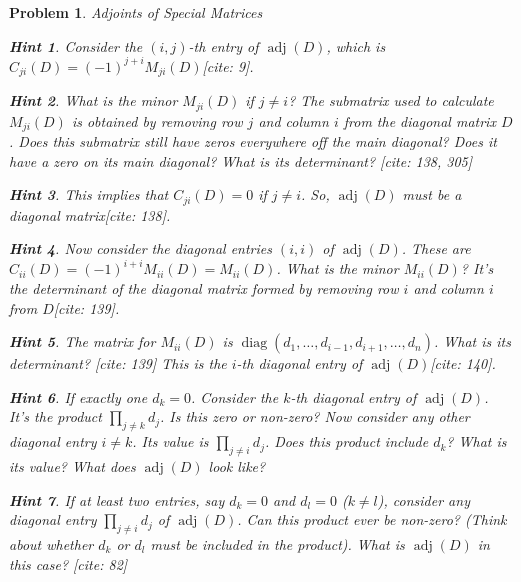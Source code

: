 \documentclass[12pt]{article}
\newtheorem{problem}{Problem}[section]
\theoremstyle{definition}
\newtheorem{hint}{Hint}[question]
\newcommand{\adj}{\operatorname{adj}}
\begin{document}
\begin{problem}{Adjoints of Special Matrices}
        \begin{hint}
            Consider the $(i, j)$-th entry of $\adj(D)$, which is $C_{ji}(D) = (-1)^{j+i} M_{ji}(D)$[cite: 9].
        \end{hint}
        \begin{hint}
            What is the minor $M_{ji}(D)$ if $j \neq i$? The submatrix used to calculate $M_{ji}(D)$ is obtained by removing row $j$ and column $i$ from the diagonal matrix $D$. Does this submatrix still have zeros everywhere off the main diagonal? Does it have a zero on its main diagonal? What is its determinant? [cite: 138, 305]
        \end{hint}
         \begin{hint}
             This implies that $C_{ji}(D) = 0$ if $j \neq i$. So, $\adj(D)$ must be a diagonal matrix[cite: 138].
         \end{hint}
        \begin{hint}
            Now consider the diagonal entries $(i, i)$ of $\adj(D)$. These are $C_{ii}(D) = (-1)^{i+i} M_{ii}(D) = M_{ii}(D)$. What is the minor $M_{ii}(D)$? It's the determinant of the diagonal matrix formed by removing row $i$ and column $i$ from $D$[cite: 139].
        \end{hint}
        \begin{hint}
            The matrix for $M_{ii}(D)$ is $\operatorname{diag}(d_1, \dots, d_{i-1}, d_{i+1}, \dots, d_n)$. What is its determinant? [cite: 139] This is the $i$-th diagonal entry of $\adj(D)$[cite: 140].
        \end{hint}
        \begin{hint}
            If exactly one $d_k=0$. Consider the $k$-th diagonal entry of $\adj(D)$. It's the product $\prod_{j \neq k} d_j$. Is this zero or non-zero? Now consider any other diagonal entry $i \neq k$. Its value is $\prod_{j \neq i} d_j$. Does this product include $d_k$? What is its value? What does $\adj(D)$ look like?
        \end{hint}
         \begin{hint}
             If at least two entries, say $d_k=0$ and $d_l=0$ ($k \neq l$), consider any diagonal entry $\prod_{j \neq i} d_j$ of $\adj(D)$. Can this product ever be non-zero? (Think about whether $d_k$ or $d_l$ must be included in the product). What is $\adj(D)$ in this case? [cite: 82]
         \end{hint}
    
\end{problem}
\end{document}
